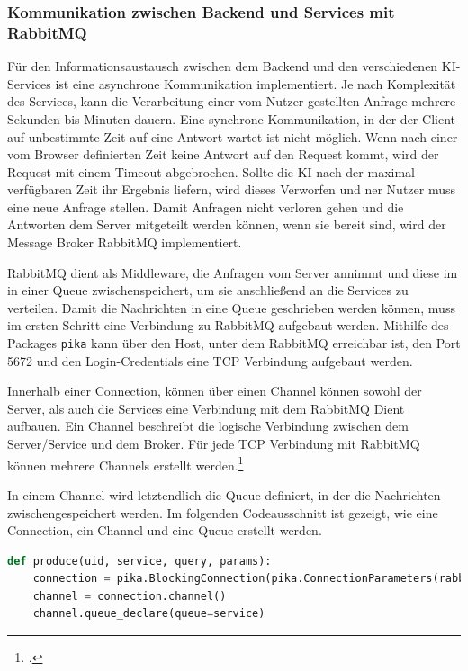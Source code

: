 \subsubsection{Kommunikation zwischen Backend und Services mit RabbitMQ}
Für den Informationsaustausch zwischen dem Backend und den verschiedenen KI-Services ist eine asynchrone Kommunikation implementiert. Je nach Komplexität des Services, kann die Verarbeitung einer vom Nutzer gestellten Anfrage mehrere Sekunden bis Minuten dauern. Eine synchrone Kommunikation, in der der Client auf unbestimmte Zeit auf eine Antwort wartet ist nicht möglich. Wenn nach einer vom Browser definierten Zeit keine Antwort auf den Request kommt, wird der Request mit einem Timeout abgebrochen. Sollte die KI nach der maximal verfügbaren Zeit ihr Ergebnis liefern, wird dieses Verworfen und ner Nutzer muss eine neue Anfrage stellen. Damit Anfragen nicht verloren gehen und die Antworten dem Server mitgeteilt werden können, wenn sie bereit sind, wird der Message Broker RabbitMQ implementiert. 

RabbitMQ dient als Middleware, die Anfragen vom Server annimmt und diese im in einer Queue zwischenspeichert, um sie anschließend an die Services zu verteilen. Damit die Nachrichten in eine Queue geschrieben werden können, muss im ersten Schritt eine Verbindung zu RabbitMQ aufgebaut werden. Mithilfe des Packages \texttt{pika} kann über den Host, unter dem RabbitMQ erreichbar ist, den Port 5672 und den Login-Credentials eine TCP Verbindung aufgebaut werden.

Innerhalb einer Connection, können über einen Channel können sowohl der Server, als auch die Services eine Verbindung mit dem RabbitMQ Dient aufbauen. Ein Channel beschreibt die logische Verbindung zwischen dem Server/Service und dem Broker. Für jede TCP Verbindung mit RabbitMQ können mehrere Channels erstellt werden.\footcite{dossot2014rabbitmq}

In einem Channel wird letztendlich die Queue definiert, in der die Nachrichten zwischengespeichert werden. Im folgenden Codeausschnitt ist gezeigt, wie eine Connection, ein Channel und eine Queue erstellt werden.

\begin{lstlisting}[language=Python]
def produce(uid, service, query, params):
    connection = pika.BlockingConnection(pika.ConnectionParameters(rabbit_host, 5672, '/', credentials))
    channel = connection.channel()
    channel.queue_declare(queue=service)
\end{lstlisting}

